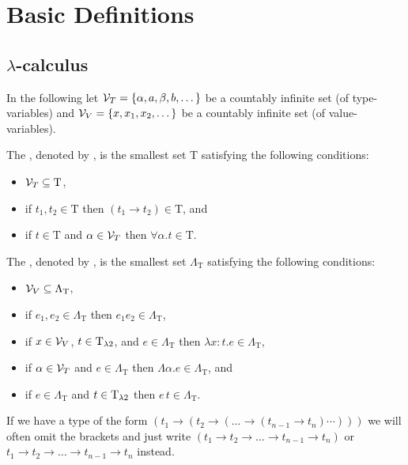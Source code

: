 \section{Basic Definitions}
\subsection{$\lambda$-calculus \lambdaTwo}
In the following let $\mathcal{V}_T=\{\alpha,a,\beta,b,\dots\}$ be a countably infinite set (of type-variables) and $\mathcal{V}_V=\{x,x_1,x_2,\dots\}$ be a countably infinite set (of value-variables).
\begin{definition}
	The , denoted by \lambdaTypes{}, is the smallest set T satisfying the following conditions: %
	\begin{itemize}
		\item $\mathcal{V}_T\subseteq\text{T}$,
		\item if $t_1,t_2\in\text{T}$ then $(t_1\to t_2)\in\text{T}$, and
		\item if $t\in\text{T}$ and $\alpha\in\mathcal{V}_T$ then $\forall\alpha.t\in\text{T}$.
	\end{itemize}
	
	The , denoted by \lambdaTerms{}, is the smallest set $\Lambda_\text{T}$ satisfying the following conditions: %
	\begin{itemize}
		\item $\mathcal{V}_V\subseteq\Lambda_\text{T}$,
		\item if $e_1,e_2\in\Lambda_\text{T}$ then $e_1e_2\in\Lambda_\text{T}$,
		\item if $x\in\mathcal{V}_V$, $t\in\text{T}_{\lambda2}$, and $e\in\Lambda_\text{T}$ then $\lambda x:t.e\in\Lambda_\text{T}$,
		\item if $\alpha\in\mathcal{V}_T$ and $e\in\Lambda_\text{T}$ then $\Lambda \alpha.e\in\Lambda_\text{T}$, and
		\item if $e\in\Lambda_\text{T}$ and $t\in\text{T}_{\lambda2}$ then $e\,t\in\Lambda_\text{T}$.
	\end{itemize}
\end{definition}
If we have a type of the form $(t_1\to(t_2\to(\dots \to(t_{n-1}\to t_n)\cdots)))$ we will often omit the brackets and just write $(t_1\to t_2\to\dots\to t_{n-1}\to t_n)$ or $t_1\to t_2\to\dots \to t_{n-1}\to t_n$ instead.
